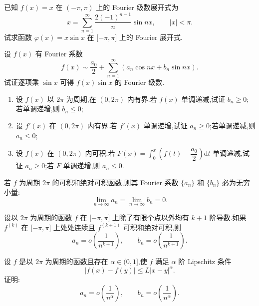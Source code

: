 \documentclass[../数学分析培优讲义.tex]{subfiles}
\begin{document}
\begin{example}
已知 $f(x)=x$ 在 $(-\pi,\pi)$ 上的 Fourier 级数展开式为
\[
    x=\sum\limits_{n=1}^{\infty}\dfrac{2(-1)^{n-1}}{n}\sin nx,
    \qquad |x|<\pi.
\]
试求函数 $\varphi(x)=x\sin x$ 在 $\lbrack -\pi,\pi\rbrack$ 上的 Fourier 展开式.
\end{example}
\exampleblank

\begin{example}
设 $f(x)$ 有 Fourier 系数
\[
    f(x)\sim\dfrac{a_0}{2}+\sum\limits_{n=1}^{\infty}(a_n\cos nx+b_n\sin nx).
\]
试证逐项乘 $\sin x$ 可得 $f(x)\sin x$ 的 Fourier 级数.
\end{example}
\exampleblank

\begin{example}[\markstar]
\begin{enumerate}[label=(\arabic*)]
    \item 设 $f(x)$ 以 $2\pi$ 为周期,在 $(0,2\pi)$ 内有界.若 $f(x)$ 单调递减,试证 $b_n\geq0$;若单调递增,则 $b_n\leq0$;
    \item 设 $f'(x)$ 在 $(0,2\pi)$ 内有界.若 $f'(x)$ 单调递增,试证 $a_n\geq0$;若单调递减,则 $a_n\leq0$;
    \item 设 $f(x)$ 在 $(0,2\pi)$ 内可积.若 $F(x)=\displaystyle\int_0^x\left(f(t)-\dfrac{a_0}{2}\right)\mathrm{d}t$ 单调递减,试证 $a_n\geq0$;若 $F$ 单调递增,则 $a_n\leq0$.
\end{enumerate}
\end{example}
\exampleblank

\begin{proposition}[\markstar]
若 $f$ 为周期 $2\pi$ 的可积和绝对可积函数,则其 Fourier 系数 $\{a_n\}$ 和 $\{b_n\}$ 必为无穷小量:
\[
    \lim\limits_{n\to\infty}a_n=\lim\limits_{n\to\infty}b_n=0.
\]
\end{proposition}

\begin{proposition}[\markstar]
设以 $2\pi$ 为周期的函数 $f$ 在 $\lbrack -\pi,\pi\rbrack$ 上除了有限个点以外均有 $k+1$ 阶导数.如果 $f^{(k)}$ 在 $\lbrack -\pi,\pi\rbrack$ 上处处连续且 $f^{(k+1)}$ 可积和绝对可积,则
\[
    a_n=o\left(\dfrac{1}{n^{k+1}}\right),
    \qquad
    b_n=o\left(\dfrac{1}{n^{k+1}}\right).
\]
\end{proposition}

\begin{example}
设 $f$ 是以 $2\pi$ 为周期的函数且存在 $\alpha\in(0,1\rbrack$,使 $f$ 满足 $\alpha$ 阶 Lipschitz 条件
\[
    |f(x)-f(y)|\leq L|x-y|^\alpha.
\]
证明:
\[
    a_n=o\left(\dfrac{1}{n^\alpha}\right),
    \qquad
    b_n=o\left(\dfrac{1}{n^\alpha}\right).
\]
\end{example}
\exampleblank
\end{document}
